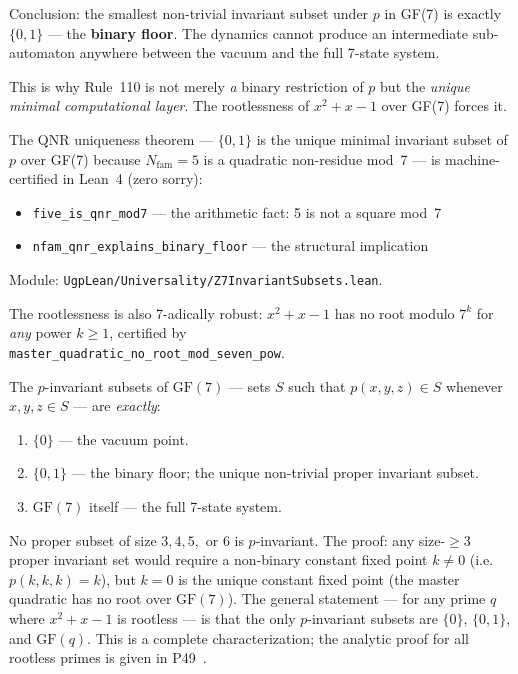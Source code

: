 \documentclass[11pt,a4paper]{article}
\newcommand{\term}[1]{\textbf{#1}}
\newcommand{\Nfam}{N_{\mathrm{fam}}}
\newcommand{\lean}[1]{\texttt{#1}}
\begin{document}
Conclusion: the smallest non-trivial invariant subset under $p$ in GF(7) is
exactly $\{0, 1\}$ — the \term{binary floor}.  The dynamics cannot produce
an intermediate sub-automaton anywhere between the vacuum and the full 7-state
system.

This is why Rule~110 is not merely \emph{a} binary restriction of $p$ but
the \emph{unique minimal computational layer}.  The rootlessness of
$x^2 + x - 1$ over GF(7) forces it.

\begin{tcolorbox}[colback=boxpurple,colframe=blue!50!black,
  title=Lean certifications]
The QNR uniqueness theorem — $\{0,1\}$ is the unique minimal invariant subset
of $p$ over GF(7) because $\Nfam = 5$ is a quadratic non-residue mod~7 — is
machine-certified in Lean~4 (zero sorry):
\begin{itemize}[itemsep=1pt]
  \item \lean{five\_is\_qnr\_mod7} — the arithmetic fact: 5 is not a square mod~7
  \item \lean{nfam\_qnr\_explains\_binary\_floor} — the structural implication
\end{itemize}
Module: \lean{UgpLean/Universality/Z7InvariantSubsets.lean}.

The rootlessness is also 7-adically robust: $x^2 + x - 1$ has no root
modulo $7^k$ for \emph{any} power $k \geq 1$, certified by\\
\mbox{\lean{master\_quadratic\_no\_root\_mod\_seven\_pow}}.
\end{tcolorbox}

\begin{tcolorbox}[colback=boxorange,colframe=orange!60!black,
  title=Complete invariant-subset taxonomy at \texorpdfstring{$q=7$}{q=7}]
The $p$-invariant subsets of $\mathrm{GF}(7)$ — sets $S$ such that
$p(x,y,z) \in S$ whenever $x,y,z \in S$ — are \emph{exactly}:
\begin{enumerate}[itemsep=2pt]
  \item $\{0\}$ — the vacuum point.
  \item $\{0,1\}$ — the binary floor; the unique non-trivial proper invariant subset.
  \item $\mathrm{GF}(7)$ itself — the full 7-state system.
\end{enumerate}
No proper subset of size $3, 4, 5,$ or $6$ is $p$-invariant.
The proof: any size-$\geq 3$ proper invariant set would require a non-binary
constant fixed point $k \neq 0$ (i.e.\ $p(k,k,k) = k$), but $k=0$ is the
unique constant fixed point (the master quadratic has no root over $\mathrm{GF}(7)$).
The general statement — for any prime $q$ where $x^2+x-1$ is rootless —
is that the only $p$-invariant subsets are $\{0\}$, $\{0,1\}$, and $\mathrm{GF}(q)$.
This is a complete characterization; the analytic proof for all rootless primes
is given in P49~\cite{SpivackGTEPolynomialWolfram}.
\end{tcolorbox}
\end{document}
